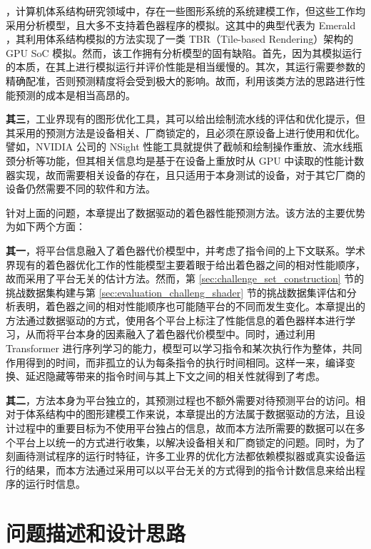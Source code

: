 {，计算机体系结构研究领域中，存在一些图形系统的系统建模工作，但这些工作均采用分析模型，且大多不支持着色器程序的模拟。这其中的典型代表为 Emerald \cite{10.1145/3307650.3322221}，其利用体系结构模拟的方法实现了一类 TBR（Tile-based Rendering）架构的 GPU SoC 模拟。然而，该工作拥有分析模型的固有缺陷。首先，因为其模拟运行的本质，在其上进行模拟运行并评价性能是相当缓慢的。其次，其运行需要参数的精确配准，否则预测精度将会受到极大的影响。故而，利用该类方法的思路进行性能预测的成本是相当高昂的。

{\bf 其三}，工业界现有的图形优化工具，其可以给出绘制流水线的评估和优化提示，但其采用的预测方法是设备相关、厂商锁定的，且必须在原设备上进行使用和优化。譬如，NVIDIA 公司的 NSight \cite{NSightGraphics} 性能工具就提供了截帧和绘制操作重放、流水线瓶颈分析等功能，但其相关信息均是基于在设备上重放时从 GPU 中读取的性能计数器实现，故而需要相关设备的存在，且只适用于本身测试的设备，对于其它厂商的设备仍然需要不同的软件和方法。

针对上面的问题，本章提出了数据驱动的着色器性能预测方法。该方法的主要优势为如下两个方面：

{\bf 其一}，将平台信息融入了着色器代价模型中，并考虑了指令间的上下文联系。学术界现有的着色器优化工作的性能模型主要着眼于给出着色器之间的相对性能顺序，故而采用了平台无关的估计方法。然而，第 \ref{sec:challenge_set_construction} 节的挑战数据集构建与第 \ref{sec:evaluation_challeng_shader} 节的挑战数据集评估和分析表明，着色器之间的相对性能顺序也可能随平台的不同而发生变化。本章提出的方法通过数据驱动的方式，使用各个平台上标注了性能信息的着色器样本进行学习，从而将平台本身的因素融入了着色器代价模型中。同时，通过利用 Transformer 进行序列学习的能力，模型可以学习指令和某次执行作为整体，共同作用得到的时间，而非孤立的认为每条指令的执行时间相同。这样一来，编译变换、延迟隐藏等带来的指令时间与其上下文之间的相关性就得到了考虑。

{\bf 其二}，方法本身为平台独立的，其预测过程也不额外需要对待预测平台的访问。相对于体系结构中的图形建模工作来说，本章提出的方法属于数据驱动的方法，且设计过程中的重要目标为不使用平台独占的信息，故而本方法所需要的数据可以在多个平台上以统一的方式进行收集，以解决设备相关和厂商锁定的问题。同时，为了刻画待测试程序的运行时特征，许多工业界的优化方法都依赖模拟器或真实设备运行的结果，而本方法通过采用可以以平台无关的方式得到的指令计数信息来给出程序的运行时信息。
}

\section{{\amend 问题描述和设计思路}}

